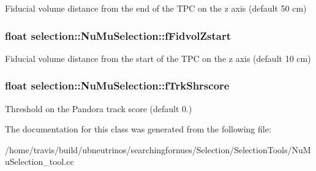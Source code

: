 Fiducial volume distance from the end of the T\-P\-C on the z axis (default 50 cm) \hypertarget{classselection_1_1NuMuSelection_afd0602fc9b69392ffb8dbc36c6ff3e61}{
\subsubsection[{f\-Fidvol\-Zstart}]{\setlength{\rightskip}{0pt plus 5cm}float selection\-::\-Nu\-Mu\-Selection\-::f\-Fidvol\-Zstart\hspace{0.3cm}{\ttfamily [private]}}}\label{classselection_1_1NuMuSelection_afd0602fc9b69392ffb8dbc36c6ff3e61}
Fiducial volume distance from the start of the T\-P\-C on the z axis (default 10 cm) \hypertarget{classselection_1_1NuMuSelection_ad112dbbc5a443a1ff5408c512788a154}{
\subsubsection[{f\-Trk\-Shrscore}]{\setlength{\rightskip}{0pt plus 5cm}float selection\-::\-Nu\-Mu\-Selection\-::f\-Trk\-Shrscore\hspace{0.3cm}{\ttfamily [private]}}}\label{classselection_1_1NuMuSelection_ad112dbbc5a443a1ff5408c512788a154}
Threshold on the Pandora track score (default 0.) 

The documentation for this class was generated from the following file\-:\begin{DoxyCompactItemize}
\item 
/home/travis/build/ubneutrinos/searchingfornues/\-Selection/\-Selection\-Tools/Nu\-Mu\-Selection\-\_\-tool.\-cc\end{DoxyCompactItemize}

